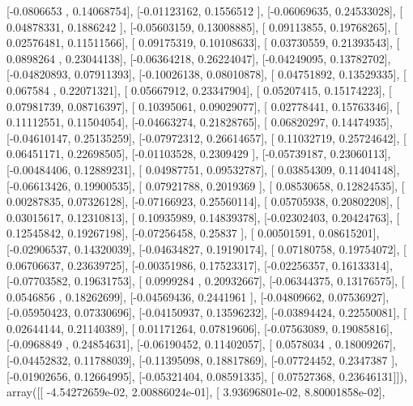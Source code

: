 \documentclass{article}
\begin{document}
       [-0.0806653 ,  0.14068754],
       [-0.01123162,  0.1556512 ],
       [-0.06069635,  0.24533028],
       [ 0.04878331,  0.1886242 ],
       [-0.05603159,  0.13008885],
       [ 0.09113855,  0.19768265],
       [ 0.02576481,  0.11511566],
       [ 0.09175319,  0.10108633],
       [ 0.03730559,  0.21393543],
       [ 0.0898264 ,  0.23044138],
       [-0.06364218,  0.26224047],
       [-0.04249095,  0.13782702],
       [-0.04820893,  0.07911393],
       [-0.10026138,  0.08010878],
       [ 0.04751892,  0.13529335],
       [ 0.067584  ,  0.22071321],
       [ 0.05667912,  0.23347904],
       [ 0.05207415,  0.15174223],
       [ 0.07981739,  0.08716397],
       [ 0.10395061,  0.09029077],
       [ 0.02778441,  0.15763346],
       [ 0.11112551,  0.11504054],
       [-0.04663274,  0.21828765],
       [ 0.06820297,  0.14474935],
       [-0.04610147,  0.25135259],
       [-0.07972312,  0.26614657],
       [ 0.11032719,  0.25724642],
       [ 0.06451171,  0.22698505],
       [-0.01103528,  0.2309429 ],
       [-0.05739187,  0.23060113],
       [-0.00484406,  0.12889231],
       [ 0.04987751,  0.09532787],
       [ 0.03854309,  0.11404148],
       [-0.06613426,  0.19900535],
       [ 0.07921788,  0.2019369 ],
       [ 0.08530658,  0.12824535],
       [ 0.00287835,  0.07326128],
       [-0.07166923,  0.25560114],
       [ 0.05705938,  0.20802208],
       [ 0.03015617,  0.12310813],
       [ 0.10935989,  0.14839378],
       [-0.02302403,  0.20424763],
       [ 0.12545842,  0.19267198],
       [-0.07256458,  0.25837   ],
       [ 0.00501591,  0.08615201],
       [-0.02906537,  0.14320039],
       [-0.04634827,  0.19190174],
       [ 0.07180758,  0.19754072],
       [ 0.06706637,  0.23639725],
       [-0.00351986,  0.17523317],
       [-0.02256357,  0.16133314],
       [-0.07703582,  0.19631753],
       [ 0.0999284 ,  0.20932667],
       [-0.06344375,  0.13176575],
       [ 0.0546856 ,  0.18262699],
       [-0.04569436,  0.2441961 ],
       [-0.04809662,  0.07536927],
       [-0.05950423,  0.07330696],
       [-0.04150937,  0.13596232],
       [-0.03894424,  0.22550081],
       [ 0.02644144,  0.21140389],
       [ 0.01171264,  0.07819606],
       [-0.07563089,  0.19085816],
       [-0.0968849 ,  0.24854631],
       [-0.06190452,  0.11402057],
       [ 0.0578034 ,  0.18009267],
       [-0.04452832,  0.11788039],
       [-0.11395098,  0.18817869],
       [-0.07724452,  0.2347387 ],
       [-0.01902656,  0.12664995],
       [-0.05321404,  0.08591335],
       [ 0.07527368,  0.23646131]]), array([[ -4.54272659e-02,   2.00886024e-01],
       [  3.93696801e-02,   8.80001858e-02],
\end{document}
